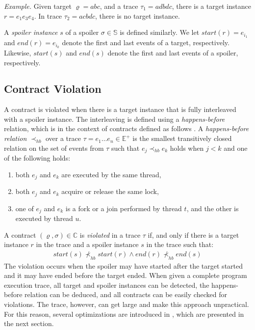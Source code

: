 \emph{Example.} Given target $\varrho = abc$, and a trace $\tau_1 = adbdc$,
there is a target instance $r = e_1 e_3 e_4$. In trace $\tau_2 = acbdc$, there
is no target instance.

A \emph{spoiler instance} $s$ of a spoiler $\sigma \in \mathbb{S}$ is defined
similarly. We let $start(r) = e_{i_1}$ and $end(r) = e_{i_k}$ denote the first
and last events of a target, respectively. Likewise, $start(s)$ and $end(s)$
denote the first and last events of a spoiler, respectively.

\subsection{Contract Violation}

A contract is violated when there is a target instance that is fully interleaved
with a spoiler instance. The interleaving is defined using a
\emph{happens-before} relation, which is in the context of contracts defined as
follows \cite{contracts}. A \emph{happens-before relation} $\prec_{hb}$ over a
trace $\tau = e_1 \ldots e_n \in \mathbb{E}^+$ is the smallest transitively
closed relation on the set of events from $\tau$ such that $e_j \prec_{hb} e_k$
holds when $j < k$ and one of the following holds:
\begin{enumerate}
    \item both $e_j$ and $e_k$ are executed by the same thread,
    \item both $e_j$ and $e_k$ acquire or release the same lock,
    \item one of $e_j$ and $e_k$ is a fork or a join performed by thread $t$,
        and the other is executed by thread $u$.
\end{enumerate}

A contract $(\varrho,\sigma) \in \mathbb{C}$ is \emph{violated} in a trace
$\tau$ if, and only if there is a target instance $r$ in the trace and a spoiler
instance $s$ in the trace such that:
\begin{align*}
    start(s) \nprec_{hb} start(r) \wedge end(r) \nprec_{hb} end(s)
\end{align*}
The violation occurs when the spoiler may have started after the target started
and it may have ended before the target ended. When given a complete program
execution trace, all target and spoiler instances can be detected, the
happens-before relation can be deduced, and all contracts can be easily checked
for violations. The trace, however, can get large and make this approach
unpractical. For this reason, several optimizations are introduced in
\cite{contracts}, which are presented in the next section.

